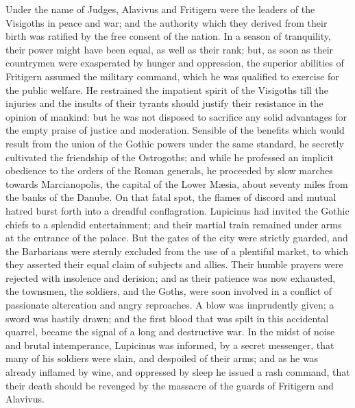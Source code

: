 

Under the name of Judges, Alavivus and Fritigern were the leaders
of the Visigoths in peace and war; and the authority which they
derived from their birth was ratified by the free consent of the
nation. In a season of tranquility, their power might have been
equal, as well as their rank; but, as soon as their countrymen
were exasperated by hunger and oppression, the superior abilities
of Fritigern assumed the military command, which he was qualified
to exercise for the public welfare. He restrained the impatient
spirit of the Visigoths till the injuries and the insults of
their tyrants should justify their resistance in the opinion of
mankind: but he was not disposed to sacrifice any solid
advantages for the empty praise of justice and moderation.
Sensible of the benefits which would result from the union of the
Gothic powers under the same standard, he secretly cultivated the
friendship of the Ostrogoths; and while he professed an implicit
obedience to the orders of the Roman generals, he proceeded by
slow marches towards Marcianopolis, the capital of the Lower
Mæsia, about seventy miles from the banks of the Danube. On that
fatal spot, the flames of discord and mutual hatred burst forth
into a dreadful conflagration. Lupicinus had invited the Gothic
chiefs to a splendid entertainment; and their martial train
remained under arms at the entrance of the palace. But the gates
of the city were strictly guarded, and the Barbarians were
sternly excluded from the use of a plentiful market, to which
they asserted their equal claim of subjects and allies. Their
humble prayers were rejected with insolence and derision; and as
their patience was now exhausted, the townsmen, the soldiers, and
the Goths, were soon involved in a conflict of passionate
altercation and angry reproaches. A blow was imprudently given; a
sword was hastily drawn; and the first blood that was spilt in
this accidental quarrel, became the signal of a long and
destructive war. In the midst of noise and brutal intemperance,
Lupicinus was informed, by a secret messenger, that many of his
soldiers were slain, and despoiled of their arms; and as he was
already inflamed by wine, and oppressed by sleep he issued a rash
command, that their death should be revenged by the massacre of
the guards of Fritigern and Alavivus.


